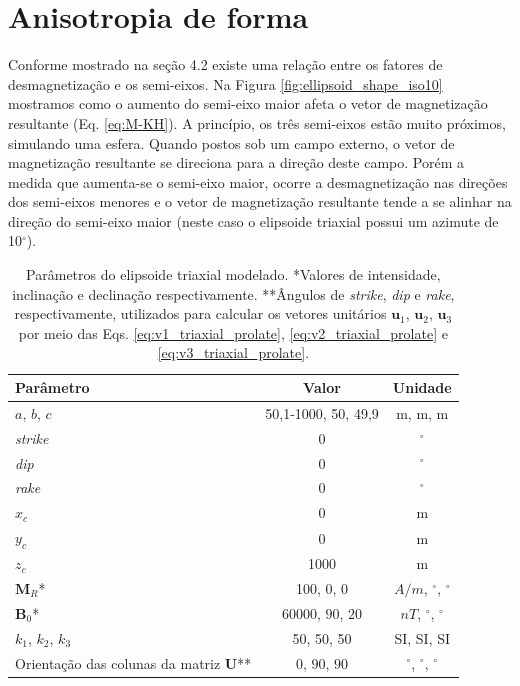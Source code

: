 \section{Anisotropia de forma}

Conforme mostrado na seção 4.2 existe uma relação entre os fatores de desmagnetização e os semi-eixos. Na Figura \ref{fig:ellipsoid_shape_iso10} mostramos como o aumento do semi-eixo maior afeta o vetor de magnetização resultante (Eq. \ref{eq:M-KH}). A princípio, os três semi-eixos estão muito próximos, simulando uma esfera. Quando postos sob um campo externo, o vetor de magnetização resultante se direciona para a direção deste campo. Porém a medida que aumenta-se o semi-eixo maior, ocorre a desmagnetização nas direções dos semi-eixos menores e o vetor de magnetização resultante tende a se alinhar na direção do semi-eixo maior (neste caso o elipsoide triaxial possui um azimute de 10$^{\circ}$).

\vspace{2cm}

\begin{table}[h!]
	\begin{center}
		\begin{tabular}{|l|c|c|}
			\hline
			\textbf{Parâmetro}  & \textbf{Valor}  & \textbf{Unidade }\\
			\hline 
			$a$, $b$, $c$  & 50,1-1000, 50, 49,9 & m, m, m\\
			\hline
			\textit{strike}   & $0$ & $^{\circ}$\\
			\hline
			\textit{dip}    & $0$ & $^{\circ}$\\
			\hline
			\textit{rake}   & $0$  & $^{\circ}$\\
			\hline
			$x_c$   & 0  & m\\
			\hline          
			$y_c$   & 0  & m\\
			\hline                
			$z_c$   & 1000  & m\\
			\hline
			$\mathbf{M}_{R}$*  & 100, $0$, $0$ & $A/m$, $^{\circ}$, $^{\circ}$ \\
			\hline
			$\mathbf{B}_{0}$*   & 60000, $90$, $20$ & $nT$, $^{\circ}$, $^{\circ}$\\
			\hline
			$k_{1}$, $k_{2}$, $k_{3}$   & 50, 50, 50  & SI, SI, SI\\
			\hline
			Orientação das colunas da matriz $\mathbf{U}$**   & $0$, $90$, $90$  & $^{\circ}$,  $^{\circ}$,  $^{\circ}$\\
			\hline
		\end{tabular}
		\caption{Parâmetros do elipsoide triaxial modelado. *Valores de intensidade, inclinação e declinação respectivamente. **Ângulos de \textit{strike}, \textit{dip}  e \textit{rake}, respectivamente, utilizados para calcular os vetores unitários $\mathbf{u}_{1}$, $\mathbf{u}_{2}$, $\mathbf{u}_{3}$ por meio das Eqs. \ref{eq:v1_triaxial_prolate}, \ref{eq:v2_triaxial_prolate} e \ref{eq:v3_triaxial_prolate}.}
	\end{center}
	\label{tab:ellipsoid_shape_iso10}
\end{table}

